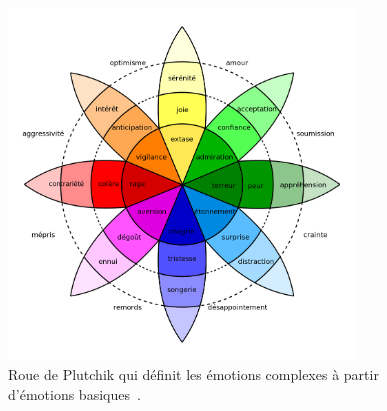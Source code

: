 \begin{figure}
  \centering
  \includegraphics[width=9.2cm]{./Chapitre1/figures/Plutchik.png}
  \caption{Roue de Plutchik qui définit les émotions complexes à partir d'émotions basiques~\cite{Plutchik1980}.}
  \label{fig:Plutchik}
\end{figure}
